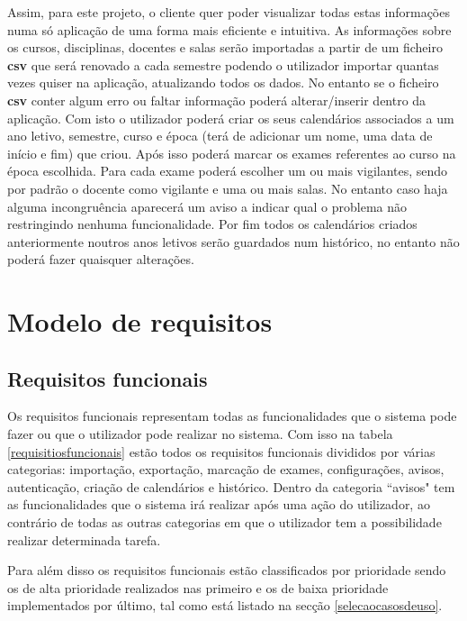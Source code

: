 \documentclass[11pt, twoside]{report}
\begin{document}
	Assim, para este projeto, o cliente quer poder visualizar todas estas informações numa só aplicação de uma forma mais eficiente e intuitiva. As informações sobre os cursos, disciplinas, docentes e salas serão importadas a partir de um ficheiro \textbf{csv} que será renovado a cada semestre podendo o utilizador importar quantas vezes quiser na aplicação, atualizando todos os dados. No entanto se o ficheiro \textbf{csv} conter algum erro ou faltar informação poderá alterar/inserir dentro da aplicação.
	Com isto o utilizador poderá criar os seus calendários associados a um ano letivo, semestre, curso e época (terá de adicionar um nome, uma data de início e fim) que criou.
	Após isso poderá marcar os exames referentes ao curso na época escolhida.
	Para cada exame poderá escolher um ou mais vigilantes, sendo por padrão o docente como vigilante e uma ou mais salas.
	No entanto caso haja alguma incongruência aparecerá um aviso a indicar qual o problema não restringindo nenhuma funcionalidade.
	Por fim todos os calendários criados anteriormente noutros anos letivos serão guardados num histórico, no entanto não poderá fazer quaisquer alterações.
	
	\chapter{Modelo de requisitos}
	\label{requisitos}
	\section{Requisitos funcionais}
	
	
	Os requisitos funcionais representam todas as funcionalidades que o sistema pode fazer ou que o utilizador pode realizar no sistema. Com isso na tabela \ref{requisitiosfuncionais} estão todos os requisitos funcionais divididos por várias categorias: importação, exportação, marcação de exames, configurações, avisos, autenticação, criação de calendários e histórico. Dentro da categoria ``avisos" tem as funcionalidades que o sistema irá realizar após uma ação do utilizador, ao contrário de todas as outras categorias em que o utilizador tem a possibilidade realizar determinada tarefa.
	
	Para além disso os requisitos funcionais estão classificados por prioridade sendo os de alta prioridade realizados nas primeiro e os de baixa prioridade implementados por último, tal como está listado na secção \ref{selecaocasosdeuso}.  
	
	
	
\end{document}
